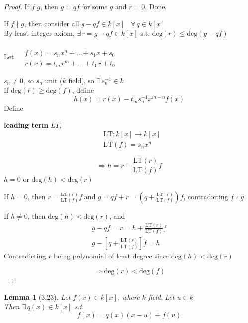 \documentclass[twoside,landscape]{amsart}
\theoremstyle{plain}
\newtheorem{lemma}{Lemma}
\theoremstyle{definition}
\theoremstyle{remark}
\begin{document}
\begin{multicols*}{2}
\begin{proof}
If $f | g$, then $g=qf$ for some $q$ and $r=0$.  Done.  

If $f \nmid g$, then consider all $g-qf \in k[x]$ \, $\forall \, q \in k[x]$ \\
By least integer axiom, $\exists \, r = g -qf \in k[x]$ s.t. $\text{deg}(r) \leq \text{deg}(g-qf)$

Let $\begin{aligned} & \quad \\
  & f(x) = s_n x^n + \dots + s_1x + s_0 \\
  & r(x) = t_m x^m + \dots + t_1x + t_0 \end{aligned}$

$s_n \neq 0 $, so $s_n$ unit ($k$ field), so $\exists \, s_n^{-1} \in k$ \\
If $\text{deg}(r) \geq \text{deg}(f)$, define
\[
h(x) = r(x) - t_ms_n^{-1}x^{m-n}f(x)
\]
Define

\textbf{leading term} $LT$, 
\[
\begin{aligned} 
  & \text{LT}:k[x] \to k[x] \\
  & \text{LT}(f) = s_n x^n \end{aligned}
\]

\[
\Longrightarrow h = r - \frac{\text{LT}(r) }{ \text{LT}(f) }f 
\]
$h=0$ or $\text{deg}(h) < \text{deg}(r)$

If $h=0$, then $r = \frac{\text{LT}(r)}{\text{LT}(f)}f$ and $g =qf + r = \left( q + \frac{\text{LT}(r)}{ \text{LT}(f)} \right)f$, contradicting $f \nmid g$

If $h\neq 0$, then $\text{deg}(h) < \text{deg}(r)$, and 
\[
\begin{gathered}
  g - qf = r = h + \frac{\text{LT}(r) }{ \text{LT}(f) } f \\ 
  g - \left[ q + \frac{\text{LT}(r)}{ \text{LT}(f)} \right]f = h 
\end{gathered}
\]
Contradicting $r$ being polynomial of least degree since $\text{deg}(h) < \text{deg}(r)$

\[
\Longrightarrow \text{deg}(r) < \text{deg}(f)
\]



\end{proof}


\begin{lemma}[3.23]
  Let $f(x) \in k[x]$, where $k$ field.  Let $u\in k$ \\
Then $\exists \, q(x) \in k[x]$ s.t. 
\[
f(x) = q(x)(x-u) + f(u)
\]

\end{lemma}


\end{multicols*}
\end{document}
